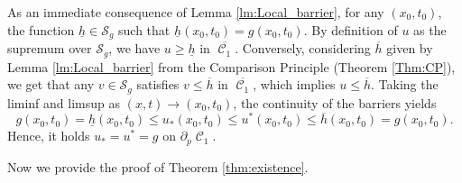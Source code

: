 \documentclass[12pt]{article}
\numberwithin{Theorem}{section}
\theoremstyle{definition}
\theoremstyle{remark}
\numberwithin{equation}{section}
\DeclareMathOperator{\C}{\mathcal{C}}
\newcommand{\p}{\partial}
\begin{document}
As an immediate consequence of Lemma \ref{lm:Local_barrier}, for any $(x_0,t_0)$, the function $\underline{h} \in \mathcal{S}_g$ such that $\underline{h}(x_0,t_0) = g(x_0,t_0)$. By definition of $u$ as the supremum over $\mathcal{S}_g$, we have $u \ge \underline{h}$ in $\overline{\C_1}$. 
Conversely, considering $\overline{h}$ given by Lemma \ref{lm:Local_barrier} from the Comparison Principle (Theorem \ref{Thm:CP}), we get that any $v \in \mathcal{S}_g$ satisfies $v \le \overline{h}$ in $\overline{\C_1}$, which implies $u \le \overline{h}$. 
Taking the liminf and limsup as $(x,t) \to (x_0, t_0)$, the continuity of the barriers yields
\[
g(x_0, t_0) = \underline{h}(x_0, t_0) \le u_*(x_0,t_0) \le u^*(x_0,t_0) \le \overline{h}(x_0, t_0) = g(x_0, t_0).
\]
Hence, it holds $u_* = u^* = g$ on $\p_p \C_1$.



Now we provide the proof of Theorem \ref{thm:existence}.
\end{document}
